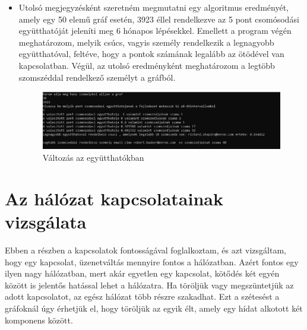 \begin{itemize}
\begin{figure}[h]
    \end{figure}
    \item Utolsó megjegyzésként szeretném megmutatni egy algoritmus eredményét, amely egy 50 elemű gráf esetén, 3923 éllel rendelkezve az 5 pont csomósodási együtthatóját jeleníti meg 6 hónapos lépésekkel. Emellett a program végén meghatározom, melyik csúcs, vagyis személy rendelkezik a legnagyobb együtthatóval, feltéve, hogy a pontok számának legalább az ötödével van kapcsolatban. Végül, az utolsó eredményként meghatározom a legtöbb szomszéddal rendelkező személyt a gráfból.
    \begin{figure}[h]
        \centering
        \includegraphics[scale=0.6]{images/eredmeny2}
        \caption{Változás az együtthatókban}
        
    \end{figure}
\end{itemize}

\section{Az hálózat kapcsolatainak vizsgálata}

Ebben a részben a kapcsolatok fontosságával foglalkoztam, és azt vizsgáltam, hogy egy kapcsolat, üzenetváltás mennyire fontos a hálózatban. Azért fontos egy ilyen nagy hálózatban, mert akár egyetlen egy kapcsolat, kötődés két egyén között is jelentős hatással lehet a hálózatra. Ha töröljük vagy megszüntetjük az adott kapcsolatot, az egész hálózat több részre szakadhat. Ezt a szétesést a gráfoknál úgy érhetjük el, hogy töröljük az egyik élt, amely egy hídat alkotott két komponens között.
\newpage


